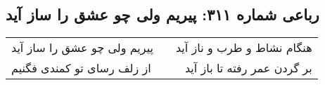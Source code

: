 \begin{center}
\section*{رباعی شماره ۳۱۱: پیریم ولی چو عشق را ساز آید}
\label{sec:sh311}
\begin{longtable}{l p{0.5cm} r}
پیریم ولی چو عشق را ساز آید
&&
هنگام نشاط و طرب و ناز آید
\\
از زلف رسای تو کمندی فگنیم
&&
بر گردن عمر رفته تا باز آید
\\
\end{longtable}
\end{center}
